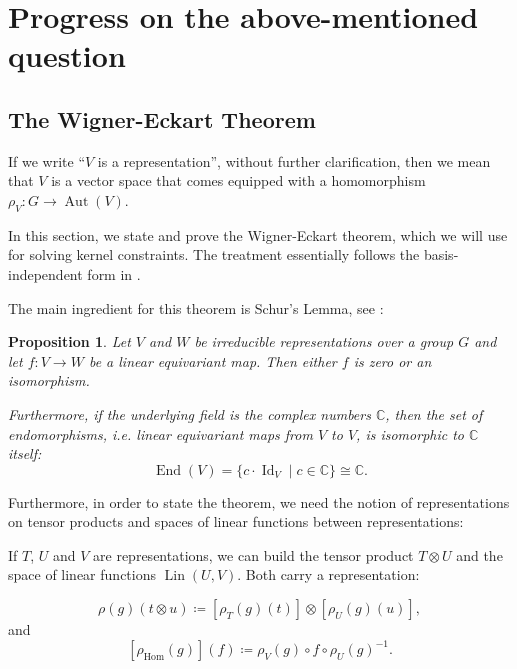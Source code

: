 \documentclass[12pt, a4paper]{article}
\theoremstyle{plain}
\newtheorem{pro}{Proposition}[section]
\theoremstyle{definition}
\theoremstyle{remark}
\newcommand{\C}{\mathds{C}}
\DeclareMathOperator{\lin}{Lin}
\DeclareMathOperator{\aut}{Aut}
\DeclareMathOperator{\End}{End}
\DeclareMathOperator{\Id}{Id}
\begin{document}
\section{Progress on the above-mentioned question}

\subsection{The Wigner-Eckart Theorem}

If we write ``$V$ is a representation'', without further clarification, then we mean that $V$ is a vector space that comes equipped with a homomorphism $\rho_V: G \to \aut (V)$.

In this section, we state and prove the Wigner-Eckart theorem, which we will use for solving kernel constraints. The treatment essentially follows the basis-independent form in \cite{wigner-eckart}.

The main ingredient for this theorem is Schur's Lemma, see \cite{Jeevanjee}:

\begin{pro}\label{Schur}
Let $V$ and $W$ be irreducible representations over a group $G$ and let $f: V \to W$ be a linear equivariant map. Then either $f$ is zero or an isomorphism.

Furthermore, if the underlying field is the complex numbers $\C$, then the set of endomorphisms, i.e. linear equivariant maps from $V$ to $V$, is isomorphic to $\C$ itself:
\begin{equation*}
\End(V) = \{c \cdot \Id_V \mid c \in \C\} \cong \C.
\end{equation*}
\end{pro}

Furthermore, in order to state the theorem, we need the notion of representations on tensor products and spaces of linear functions between representations:

If $T$, $U$ and $V$ are representations, we can build the tensor product $T \otimes U$ and the space of linear functions $\lin(U, V)$. Both carry a representation:

\begin{equation*}
\rho(g)(t \otimes u) \coloneqq \left[ \rho_T(g)(t)\right] \otimes \left[ \rho_U(g)(u)\right],
\end{equation*}
and
\begin{equation*}
\left[\rho_{\text{Hom}}(g)\right](f) \coloneq \rho_V(g) \circ f \circ \rho_U(g)^{-1}.
\end{equation*}
\end{document}
